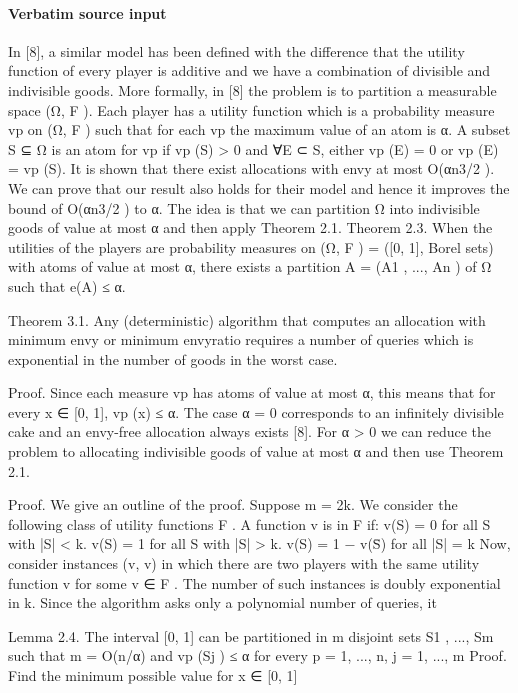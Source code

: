 \documentclass[10pt]{article}
\begin{document}
\paragraph{Verbatim source input}
\begin{ReviewVerbatim}
In [8], a similar model has been defined with the difference
that the utility function of every player is additive and we
have a combination of divisible and indivisible goods. More
formally, in [8] the problem is to partition a measurable
space (Ω, F ). Each player has a utility function which is a
probability measure vp on (Ω, F ) such that for each vp the
maximum value of an atom is α. A subset S ⊆ Ω is an
atom for vp if vp (S) > 0 and ∀E ⊂ S, either vp (E) = 0 or
vp (E) = vp (S). It is shown that there exist allocations with
envy at most O(αn3/2 ).
We can prove that our result also holds for their model
and hence it improves the bound of O(αn3/2 ) to α. The idea
is that we can partition Ω into indivisible goods of value at
most α and then apply Theorem 2.1.
Theorem 2.3. When the utilities of the players are probability measures on (Ω, F ) = ([0, 1], Borel sets) with atoms
of value at most α, there exists a partition A = (A1 , ..., An )
of Ω such that e(A) ≤ α.

Theorem 3.1. Any (deterministic) algorithm that computes an allocation with minimum envy or minimum envyratio requires a number of queries which is exponential in
the number of goods in the worst case.

Proof. Since each measure vp has atoms of value at most
α, this means that for every x ∈ [0, 1], vp ({x}) ≤ α. The
case α = 0 corresponds to an infinitely divisible cake and
an envy-free allocation always exists [8]. For α > 0 we can
reduce the problem to allocating indivisible goods of value
at most α and then use Theorem 2.1.

Proof. We give an outline of the proof. Suppose m = 2k.
We consider the following class of utility functions F . A
function v is in F if:
v(S) = 0 for all S with |S| < k.
v(S) = 1 for all S with |S| > k.
v(S) = 1 − v(S̄) for all |S| = k
Now, consider instances (v, v) in which there are two players with the same utility function v for some v ∈ F . The
number of such instances is doubly exponential in k. Since
the algorithm asks only a polynomial number of queries, it

Lemma 2.4. The interval [0, 1] can be partitioned in m
disjoint sets S1 , ..., Sm such that m = O(n/α) and vp (Sj ) ≤
α for every p = 1, ..., n, j = 1, ..., m
Proof. Find the minimum possible value for x ∈ [0, 1]
\end{ReviewVerbatim}
\end{document}
